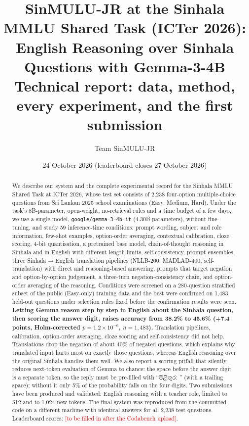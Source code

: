 \documentclass[10pt,a4paper]{article}
\title{\textbf{SinMULU-JR at the Sinhala MMLU Shared Task (ICTer 2026):\\
English Reasoning over Sinhala Questions with Gemma-3-4B}\\[4pt]
\large Technical report: data, method, every experiment, and the first submission}
\author{Team SinMULU-JR}
\date{24 October 2026 (leaderboard closes 27 October 2026)}
\newcommand{\si}[1]{{\sinhalafont #1}}
\newcommand{\todo}[1]{\textcolor{red}{[#1]}}
\begin{document}
\maketitle

\begin{abstract}
\noindent We describe our system and the complete experimental record for the Sinhala MMLU Shared Task at ICTer 2026,
whose test set consists of 2,238 four-option multiple-choice questions from Sri Lankan 2025 school examinations
(Easy, Medium, Hard). Under the task's 8B-parameter, open-weight, no-retrieval rules and a time budget of a few days, we
use a single model, \texttt{google/gemma-3-4b-it} (4.30B parameters), without fine-tuning, and study 59 inference-time
conditions: prompt wording, subject and role information, few-shot examples, option-order averaging, contextual
calibration, cloze scoring, 4-bit quantisation, a pretrained base model, chain-of-thought reasoning in Sinhala and in
English with different length limits, self-consistency, prompt ensembles, three Sinhala$\rightarrow$English
translation pipelines (NLLB-200, MADLAD-400, self-translation) with direct and reasoning-based answering, prompts
that target negation and option-by-option judgement, a three-turn negation-consistency chain, and option-order
averaging of the reasoning.
Conditions were screened on a 280-question stratified subset of the public (Easy-only) training data and the best were
confirmed on 1,483 held-out questions under selection rules fixed before the confirmation results were seen.
\textbf{Letting Gemma reason step by step in English about the Sinhala question, then scoring the answer digit, raises
accuracy from 38.2\% to 45.6\% (+7.4 points, Holm-corrected $p = 1.2\times10^{-6}$, $n=1{,}483$).} Translation
pipelines, calibration, option-order averaging, cloze scoring and self-consistency did not help. Translations drop
the negation of about 40\% of negated questions, which explains why translated input hurts most on exactly those
questions, whereas English reasoning over the original Sinhala handles them well. We also report a scoring pitfall
that silently reduces next-token evaluation of Gemma to chance: the space before the answer digit is a separate token,
so the reply must be pre-filled with ``\si{පිළිතුර}: '' (with a trailing space); without it only 5\% of the probability
falls on the four digits. Two submissions have been produced and validated: English reasoning with a teacher role,
limited to 512 and to 1,024 new tokens. The final system was reproduced from the committed code on a different machine
with identical answers for all 2,238 test questions. Leaderboard scores: \todo{to be filled in after the Codabench
upload}.
\end{abstract}
\end{document}
